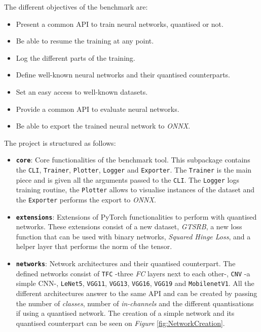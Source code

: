 The different objectives of the benchmark are:
\begin{itemize}
  \item Present a common API to train neural networks, quantised or not.
  \item Be able to resume the training at any point.
  \item Log the different parts of the training.
  \item Define well-known neural networks and their quantised counterparts.
  \item Set an easy access to well-known datasets.
  \item Provide a common API to evaluate neural networks.
  \item Be able to export the trained neural network to \emph{ONNX}.
\end{itemize}

The project is structured as follows:
\begin{itemize}
  \item \textbf{\texttt{core}}: Core functionalities of the benchmark tool. This subpackage contains the \texttt{CLI}, \texttt{Trainer}, \texttt{Plotter}, \texttt{Logger} and \texttt{Exporter}. The \texttt{Trainer} is the main piece and is given all the arguments passed to the \texttt{CLI}. The \texttt{Logger} logs training routine, the \texttt{Plotter} allows to visualise instances of the dataset and the \texttt{Exporter} performs the export to \emph{ONNX}.
  \item \textbf{\texttt{extensions}}: Extensions of PyTorch functionalities to perform with quantised networks. These extensions consist of a new dataset, \emph{GTSRB}, a new loss function that can be used with binary networks, \emph{Squared Hinge Loss}, and a helper layer that performs the norm of the tensor.
  \item \textbf{\texttt{networks}}: Network architectures and their quantised counterpart. The defined networks consist of \texttt{TFC} -three \emph{FC} layers next to each other-, \texttt{CNV} -a simple CNN-, \texttt{LeNet5}, \texttt{VGG11}, \texttt{VGG13}, \texttt{VGG16}, \texttt{VGG19} and \texttt{MobilenetV1}. All the different architectures answer to the same API and can be created by passing the number of \emph{classes}, number of \emph{in-channels} and the different quantisations if using a quantised network. The creation of a simple network and its quantised counterpart can be seen on \emph{Figure} \ref{fig:NetworkCreation}.
\end{itemize}

